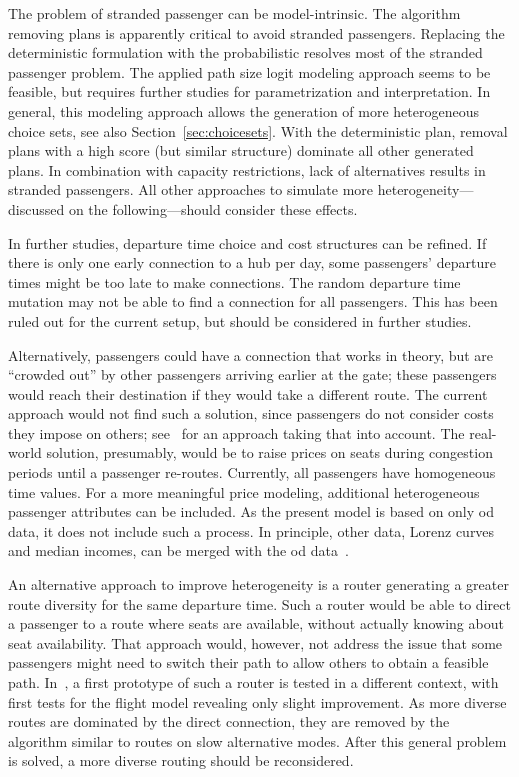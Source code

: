 The problem of stranded passenger can be model-intrinsic. 
The algorithm removing plans is apparently critical to avoid stranded passengers. 
Replacing the deterministic formulation with the probabilistic resolves most of the stranded passenger problem. 
The applied path size logit modeling approach seems to be feasible, but requires further studies for parametrization and interpretation. 
In general, this modeling approach allows the generation of more heterogeneous choice sets, see also Section~\ref{sec:choicesets}. 
With the deterministic plan, removal plans with a high score (but similar structure) dominate all other generated plans. 
In combination with capacity restrictions, lack of alternatives results in stranded passengers.  
All other approaches to simulate more heterogeneity---discussed on the following---should consider these effects.  

In further studies, departure time choice and cost structures can be refined. 
If there is only one early connection to a hub per day, some passengers' departure times might be too late to make connections. 
The random departure time mutation may not be able to find a connection for all passengers. 
This has been ruled out for the current setup, but should be considered in further studies. 

Alternatively, passengers could have a connection that works in theory, but are ``crowded out'' by other passengers arriving earlier at the gate;  
these passengers would reach their destination if they would take a different route.  
The current approach would not find such a solution, since passengers do not consider costs they impose on others; see~\citet{00LaemmelFloetteroed2009KISysOptEvac} for an approach taking that into account.  
The real-world solution, presumably, would be to raise prices on seats during congestion periods until a passenger re-routes. 
Currently, all passengers have homogeneous time values.   
For a more meaningful price modeling, additional heterogeneous passenger attributes can be included. 
As the present model is based on only \gls{od} data, it does not include such a process. 
In principle, other data, \eg Lorenz curves and median incomes, can be merged with the \gls{od} data~\citep{KickhoeferEtAl_Transportation_2011}.  

An alternative approach to improve heterogeneity is a router generating a greater route diversity for the same departure time.  
Such a router would be able to direct a passenger to a route where seats are available, without actually knowing about seat availability.  
That approach would, however, not address the issue that some passengers might need to switch their path to allow others to obtain a feasible path. 
In~\citet{Graf2013Da}, a first prototype of such a router is tested in a different context, with 
first tests for the flight model revealing only slight improvement. 
As more diverse routes are dominated by the direct connection, they are removed by the algorithm similar to routes on slow alternative modes. 
After this general problem is solved, a more diverse routing should be reconsidered. 

